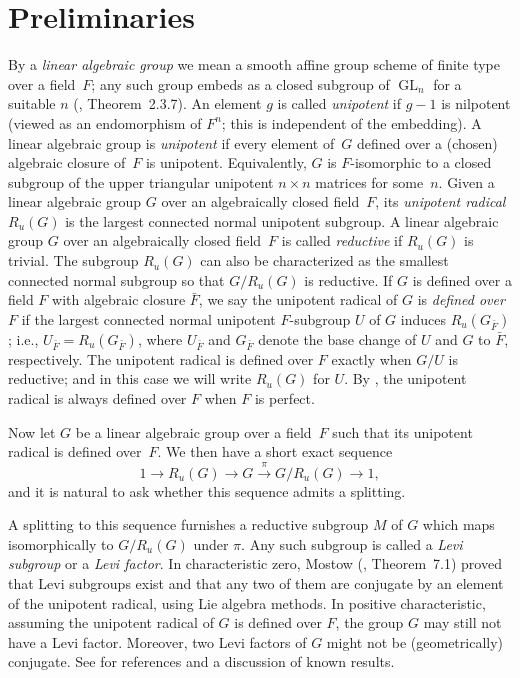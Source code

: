 \documentclass[12pt]{amsart}
\theoremstyle{plain}
\theoremstyle{definition}
\theoremstyle{remark}
\begin{document}
\section{Preliminaries}

By a {\em linear algebraic group} we mean a smooth affine group scheme of finite type over a field~$F$; any such group  embeds as a closed subgroup of $\operatorname{GL}_{n}$ for a suitable $n$ (\cite{Springer}, Theorem~2.3.7). An element $g$ is called {\em unipotent} if $g-1$ is nilpotent (viewed as an endomorphism of $F^n$; this is independent of the embedding). A linear algebraic group is {\em unipotent} if every element of~$G$ defined over a (chosen) algebraic
  closure of~$F$ is unipotent. Equivalently, $G$ is $F$-isomorphic to a closed subgroup of the upper triangular unipotent $n\times n$ matrices for some~$n$. Given a linear algebraic group $G$ over an algebraically closed field~$F$, its {\em unipotent radical} $R_u(G)$ is the largest connected normal unipotent subgroup. A linear algebraic group $G$ over an algebraically closed field~$F$ is called {\em reductive} if $R_u(G)$ is trivial. The subgroup $R_u(G)$ can also be characterized as the smallest connected normal subgroup so that $G/R_u(G)$ is reductive. If $G$ is defined over a field $F$ with algebraic closure $\bar F$, we say the unipotent radical of $G$ is {\em defined over $F$} if the largest connected normal unipotent $F$-subgroup $U$ of $G$ induces $R_u(G_{\bar F})$; i.e., $U_{\bar F}=R_u(G_{\bar F})$, where $U_{\bar F}$ and $G_{\bar F}$ denote the base change of $U$ and $G$ to $\bar F$, respectively.  The unipotent radical is defined over $F$ exactly when  $G/U$ is reductive; and in this case we will write $R_u(G)$ for $U$.  By \cite[12.1.7(d)]{Springer}, the unipotent radical is always defined over $F$ when $F$ is perfect. 

Now let $G$ be a linear algebraic group over a field~$F$ such that its unipotent radical is defined over~$F$. We then have a short exact sequence
$$1\rightarrow R_u(G)\rightarrow G\overset{\pi}{\rightarrow} G/R_u(G)\rightarrow 1, $$
and it is natural to ask whether this sequence admits a splitting. 

A splitting to this sequence furnishes a reductive subgroup $M$ of $G$ which maps isomorphically to $G/R_u(G)$ under $\pi$. Any such subgroup is called a {\em Levi subgroup} or a {\em Levi factor}. In characteristic zero, Mostow (\cite{Mostow}, Theorem~7.1) proved that Levi subgroups exist and that any two of them are conjugate by an element of the unipotent radical, using Lie algebra methods. In positive characteristic, assuming the unipotent radical of $G$ is defined over $F$, the group $G$ may still not have a Levi factor. Moreover, two Levi factors of $G$ might not be (geometrically) conjugate. See \cite[Section~3]{McNinch10} for references and a discussion of known results. 
\end{document}
